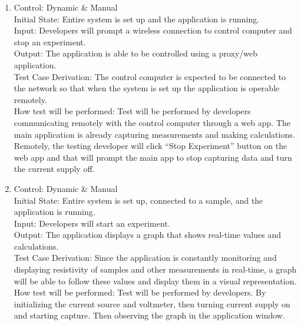 \documentclass[12pt, titlepage]{article}
\begin{document}
\begin{enumerate}[{FR-T}1.]
    \item Control: Dynamic \& Manual\\
    Initial State: Entire system is set up and the application is running.\\
    Input: Developers will prompt a wireless connection to control computer and stop an experiment.\\
    Output: The application is able to be controlled using a proxy/web application.\\
    Test Case Derivation: The control computer is expected to be connected to the network so that when the system is set up the application is operable remotely.\\
    How test will be performed: Test will be performed by developers communicating remotely with the control computer through a web app. The main application is already capturing measurements and making calculations. Remotely, the testing developer will click “Stop Experiment” button on the web app and that will prompt the main app to stop capturing data and turn the current supply off.

    \item Control: Dynamic \& Manual\\
    Initial State: Entire system is set up, connected to a sample, and the application is running.\\
    Input: Developers will start an experiment.\\
    Output: The application displays a graph that shows real-time values and calculations.\\
    Test Case Derivation: Since the application is constantly monitoring and displaying resistivity of samples and other measurements in real-time, a graph will be able to follow these values and display them in a visual representation.\\
    How test will be performed: Test will be performed by developers. By initializing the current source and voltmeter, then turning current supply on and starting capture. Then observing the graph in the application window.


\end{enumerate}
\end{document}
